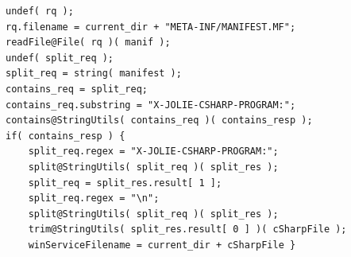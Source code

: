 \documentclass[12pt,a4paper]{article}
\begin{document}
\begin{lstlisting}[caption={Find .exe file in jap},label={lst:findWinService}]
undef( rq );                                                                                                                                                                                   
rq.filename = current_dir + "META-INF/MANIFEST.MF";                                                                                                                                            
readFile@File( rq )( manif );                                                                                                                                                                  
undef( split_req );                                                                                                                                                                            
split_req = string( manifest );                                                                                                                                                                
contains_req = split_req;                                                                                                                                                                      
contains_req.substring = "X-JOLIE-CSHARP-PROGRAM:";                                                                                                                                            
contains@StringUtils( contains_req )( contains_resp );                                                                                                                                         
if( contains_resp ) {                                                                                                                                                                          
	split_req.regex = "X-JOLIE-CSHARP-PROGRAM:";                                                                                                                                               
	split@StringUtils( split_req )( split_res );                                                                                                                                               
	split_req = split_res.result[ 1 ];                                                                                                                                                         
	split_req.regex = "\n";                                                                                                                                                                    
	split@StringUtils( split_req )( split_res );                                                                                                                                               
	trim@StringUtils( split_res.result[ 0 ] )( cSharpFile );                                                                                                                                   
	winServiceFilename = current_dir + cSharpFile }
\end{lstlisting}              
\end{document}
